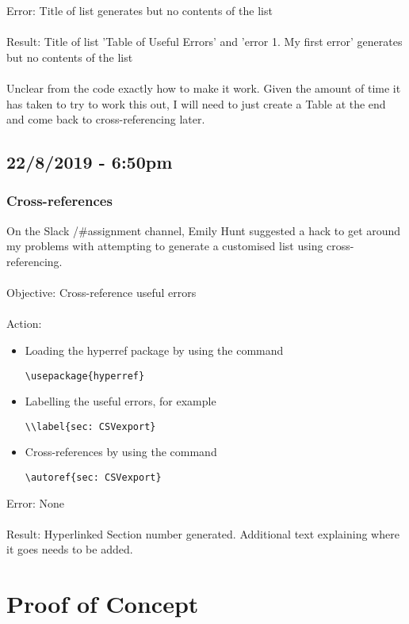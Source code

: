 \documentclass{article}
\begin{document}
Error: Title of list generates but no contents of the list\\\\
Result: Title of list 'Table of Useful Errors' and 'error 1. My first error' generates but no contents of the list\\\\

Unclear from the code exactly how to make it work. Given the amount of time it has taken to try to work this out, I will need to just create a Table at the end and come back to cross-referencing later.

\subsection*{22/8/2019 - 6:50pm}
\subsubsection*{Cross-references}

On the Slack /#assignment channel, Emily Hunt suggested a hack to get around my problems with attempting to generate a customised list using cross-referencing.\\\\
Objective: Cross-reference useful errors\\\\
Action:
\begin{itemize}
\item Loading the hyperref package by using the command \begin{verbatim}\usepackage{hyperref}\end{verbatim}
\item Labelling the useful errors, for example 
\begin{verbatim}\\label{sec: CSVexport}\end{verbatim}
\item Cross-references by using the command \begin{verbatim}\autoref{sec: CSVexport}\end{verbatim}
\end{itemize}
Error: None\\\\
Result: Hyperlinked Section number generated. Additional text explaining where it goes needs to be added.

\newpage
\section{Proof of Concept}
\end{document}
